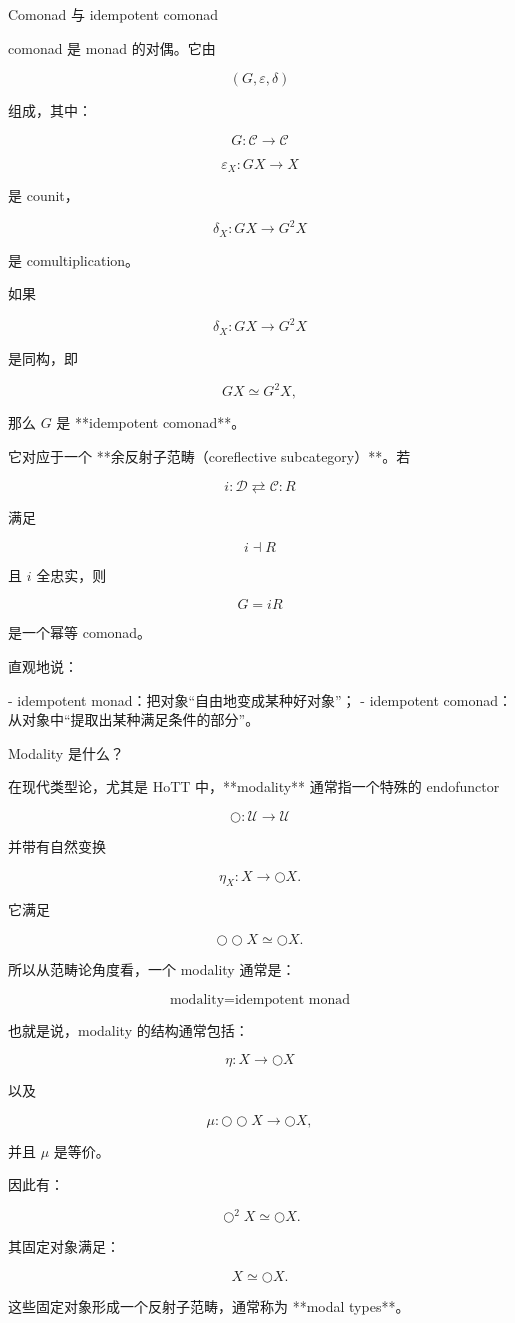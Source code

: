 \documentclass{beamer}
\begin{document}
\begin{frame}{Comonad 与 idempotent comonad}
\begin{markdown}
comonad 是 monad 的对偶。它由

$$
(G,\varepsilon,\delta)
$$

组成，其中：

$$
G:\mathcal C\to\mathcal C
$$

$$
\varepsilon_X:GX\to X
$$

是 counit，

$$
\delta_X:GX\to G^2X
$$

是 comultiplication。

如果

$$
\delta_X:GX\to G^2X
$$

是同构，即

$$
GX\simeq G^2X,
$$

那么 $G$ 是 **idempotent comonad**。

它对应于一个 **余反射子范畴（coreflective subcategory）**。若

$$
i:\mathcal D\rightleftarrows\mathcal C:R
$$

满足

$$
i\dashv R
$$

且 $i$ 全忠实，则

$$
G=iR
$$

是一个幂等 comonad。

直观地说：

- idempotent monad：把对象“自由地变成某种好对象”；
- idempotent comonad：从对象中“提取出某种满足条件的部分”。
\end{markdown}
\end{frame}

\begin{frame}{Modality 是什么？}
\begin{markdown}
在现代类型论，尤其是 HoTT 中，**modality** 通常指一个特殊的 endofunctor

$$
\bigcirc:\mathcal U\to\mathcal U
$$

并带有自然变换

$$
\eta_X:X\to \bigcirc X.
$$

它满足

$$
\bigcirc\bigcirc X\simeq \bigcirc X.
$$

所以从范畴论角度看，一个 modality 通常是：

$$
\boxed{\text{modality}=\text{idempotent monad}}
$$

也就是说，modality 的结构通常包括：

$$
\eta:X\to \bigcirc X
$$

以及

$$
\mu:\bigcirc\bigcirc X\to \bigcirc X,
$$

并且 $\mu$ 是等价。

因此有：

$$
\bigcirc^2 X\simeq \bigcirc X.
$$

其固定对象满足：

$$
X\simeq \bigcirc X.
$$

这些固定对象形成一个反射子范畴，通常称为 **modal types**。
\end{markdown}
\end{frame}
\end{document}
